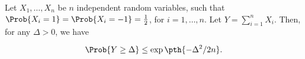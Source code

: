 \begin{theorem}
        Let $X_1, \ldots, X_n$ be $n$ independent random variables,\newline
        such that $\Prob{X_i =1} =\Prob{X_i=-1} = \frac{1}{2}$, for
        $i=1,\ldots, n$. Let $Y = \sum_{i=1}^n X_i$. Then, for any
        $\Delta >0$, we have
        \begin{align*}
            \Prob{\Bigl. Y \geq \Delta} \leq \exp \pth{-\Delta^2/2n}.
        \end{align*}
    \end{theorem}%
